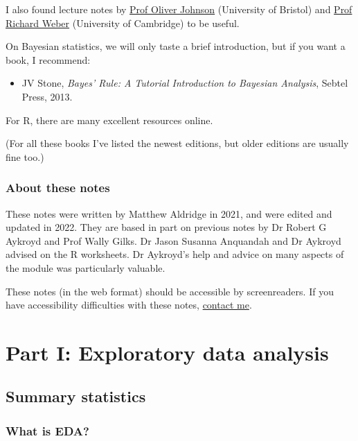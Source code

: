\documentclass[
  a4paper,
]{book}
\providecommand{\tightlist}{%
  \setlength{\itemsep}{0pt}\setlength{\parskip}{0pt}}
\theoremstyle{definition}
\theoremstyle{definition}
\theoremstyle{definition}
\theoremstyle{definition}
\theoremstyle{remark}
\begin{document}
I also found lecture notes by \href{https://people.maths.bris.ac.uk/~maotj/teaching.html}{Prof Oliver Johnson} (University of Bristol) and \href{http://www.statslab.cam.ac.uk/~rrw1/prob/index.html}{Prof Richard Weber} (University of Cambridge) to be useful.

On Bayesian statistics, we will only taste a brief introduction, but if you want a book, I recommend:

\begin{itemize}
\tightlist
\item
  JV Stone, \emph{Bayes' Rule: A Tutorial Introduction to Bayesian Analysis}, Sebtel Press, 2013.
\end{itemize}

For R, there are many excellent resources online.

(For all these books I've listed the newest editions, but older editions are usually fine too.)

\hypertarget{about-notes}{%
\section*{About these notes}\label{about-notes}}

These notes were written by Matthew Aldridge in 2021, and were edited and updated in 2022. They are based in part on previous notes by Dr Robert G Aykroyd and Prof Wally Gilks. Dr Jason Susanna Anquandah and Dr Aykroyd advised on the R worksheets. Dr Aykroyd's help and advice on many aspects of the module was particularly valuable.

These notes (in the web format) should be accessible by screenreaders. If you have accessibility difficulties with these notes, \href{mailto:m.aldridge@leeds.ac.uk}{contact me}.

\hypertarget{part-part-i-exploratory-data-analysis}{%
\part*{Part I: Exploratory data analysis}\label{part-part-i-exploratory-data-analysis}}

\hypertarget{L01-stats}{%
\chapter{Summary statistics}\label{L01-stats}}

\hypertarget{what-is-eda}{%
\section{What is EDA?}\label{what-is-eda}}
\end{document}
